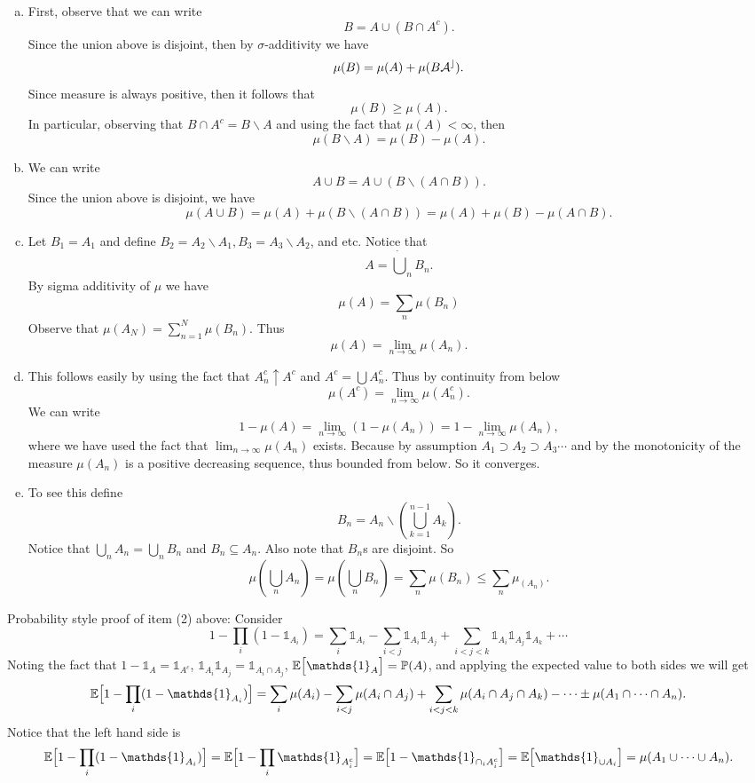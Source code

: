 \begin{solution}
	\begin{enumerate}[(a)]
		\item 
		First, observe that we can write
		\[ B = A \cup (B\cap A^c). \]
		Since the union above is disjoint, then by $ \sigma $-additivity we have
		\[ \mu(B) = \mu(A) + \mu(B\cal A^c). \]
		Since measure is always positive, then it follows that
		\[ \mu(B) \geq \mu(A). \]
		In particular, observing that $ B\cap A^c = B\backslash A $ and using the fact that $ \mu(A)<\infty $, then
		\[ \mu(B\backslash A) = \mu(B) - \mu(A). \]
		\item We can write
		\[ A \cup B = A \cup (B \backslash (A\cap B)). \]
		Since the union above is disjoint, we have
		\[ \mu(A\cup B) = \mu(A) + \mu(B\backslash (A\cap B)) = \mu(A) + \mu(B) - \mu(A\cap B). \]
		\item Let $ B_1 = A_1 $ and define $ B_2 = A_2\backslash A_1, B_3 = A_3 \backslash A_2 $, and etc. Notice that 
		\[ A = \dot\bigcup_n B_n. \]
		By sigma additivity of $ \mu $ we have
		\[ \mu(A) = \sum_n \mu(B_n) \]
		Observe that $ \mu(A_N) = \sum_{n=1}^N \mu(B_n) $. Thus
		\[ \mu(A) = \lim_{n\to\infty} \mu(A_n). \]
		\item This follows easily by using the fact that $ A_n^c \uparrow A^c $ and $ A^c = \bigcup A_n^c $. Thus by continuity from below
		\[ \mu(A^c) = \lim_{n\to\infty}\mu(A^c_n). \]
		We can write
		\[ 1 - \mu(A) = \lim_{n\to\infty}(1 - \mu(A_n)) = 1 - \lim_{n\to\infty}\mu(A_n), \]
		where we have used the fact that $ \lim_{n\to\infty}\mu(A_n) $ exists. Because by assumption $ A_1 \supset A_2 \supset A_3 \cdots $ and by the monotonicity of the measure $ \mu(A_n) $ is a positive decreasing sequence, thus bounded from below. So it converges. 
		
		\item To see this define
		\[ B_n = A_n \backslash (\bigcup_{k=1}^{n-1} A_k). \]
		Notice that $ \bigcup_n A_n = \bigcup_n B_n $ and $ B_n \subseteq A_n $. Also note that $ B_n $s are disjoint. So
		\[ \mu(\bigcup_n A_n) = \mu(\bigcup_n B_n) = \sum_n \mu(B_n) \leq \sum_n \mu_(A_n). \]
	\end{enumerate}
\end{solution}


\begin{remark}
	Probability style proof of item (2) above: Consider
	\[ 1 - \prod_{i}(1 - \mathds{1}_{A_i}) = \sum_i \mathds{1}_{A_i} - \sum_{i<j}\mathds{1}_{A_i}\mathds{1}_{A_j} + \sum_{i<j<k}\mathds{1}_{A_i}\mathds{1}_{A_j}\mathds{1}_{A_k}+\cdots  \]
	Noting the fact that $ 1 - \mathds{1}_{A} = \mathds{1}_{A^c} $, $ \mathds{1}_{A_i}\mathds{1}_{A_j} = \mathds{1}_{A_i\cap A_j} $, $ \E{\mathds{1}_{A}} = \prob(A) $, and applying the expected value to both sides we will get
	\[ \E{1 - \prod_i (1-\mathds{1}_{A_i})} = \sum_i \mu(A_i) - \sum_{i<j}\mu(A_i\cap A_j) + \sum_{i<j<k}\mu(A_i\cap A_j \cap A_k) - \cdots \pm \mu(A_1\cap\cdots\cap A_n). \]
	Notice that the left hand side is
	\[ \E{1 - \prod_i (1-\mathds{1}_{A_i})} = \E{1 - \prod_i \mathds{1}_{A_i^c}} = \E{1 - \mathds{1}_{\cap_i A_i^c}} = \E{\mathds{1}_{\cup A_i}} = \mu(A_1\cup\cdots\cup A_n). \]
\end{remark}
